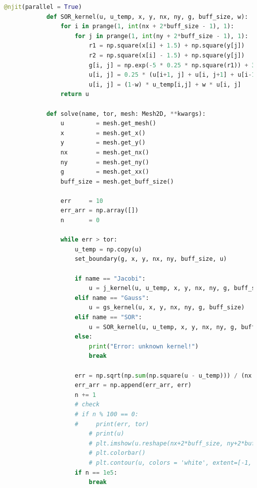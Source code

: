 \documentclass[12pt]{article}
\begin{document}
\begin{lstlisting}[language={Python}]
            @njit(parallel = True)
            def SOR_kernel(u, u_temp, x, y, nx, ny, g, buff_size, w):
                for i in prange(1, int(nx + 2*buff_size - 1), 1):
                    for j in prange(1, int(ny + 2*buff_size - 1), 1):
                        r1 = np.square(x[i] + 1.5) + np.square(y[j])
                        r2 = np.square(x[i] - 1.5) + np.square(y[j])
                        g[i, j] = np.exp(-5 * 0.25 * np.square(r1)) + 3 * 0.5 * np.exp(-np.square(r2))
                        u[i, j] = 0.25 * (u[i+1, j] + u[i, j+1] + u[i-1, j] + u[i, j-1] + g[i, j])
                        u[i, j] = (1-w) * u_temp[i,j] + w * u[i, j]
                return u
            
            def solve(name, tor, mesh: Mesh2D, **kwargs):
                u         = mesh.get_mesh()
                x         = mesh.get_x()
                y         = mesh.get_y()
                nx        = mesh.get_nx()
                ny        = mesh.get_ny()
                g         = mesh.get_xx()
                buff_size = mesh.get_buff_size()
                
                err     = 10
                err_arr = np.array([])
                n       = 0
                
                while err > tor:
                    u_temp = np.copy(u)
                    set_boundary(g, x, y, nx, ny, buff_size, u)
                    
                    if name == "Jacobi":
                        u = j_kernel(u, u_temp, x, y, nx, ny, g, buff_size)
                    elif name == "Gauss":
                        u = gs_kernel(u, x, y, nx, ny, g, buff_size)
                    elif name == "SOR":
                        u = SOR_kernel(u, u_temp, x, y, nx, ny, g, buff_size, kwargs['w'])
                    else:
                        print("Error: unknown kernel!")
                        break
            
                    err = np.sqrt(np.sum(np.square(u - u_temp))) / (nx * ny)
                    err_arr = np.append(err_arr, err)
                    n += 1
                    # check
                    # if n % 100 == 0:
                    #     print(err, tor)
                        # print(u)
                        # plt.imshow(u.reshape(nx+2*buff_size, ny+2*buff_size), origin = 'lower', extent=[-1, 1, -1, 1])
                        # plt.colorbar()
                        # plt.contour(u, colors = 'white', extent=[-1, 1, -1, 1])
                    if n == 1e5:
                        break
                    

\end{lstlisting}
\end{document}
